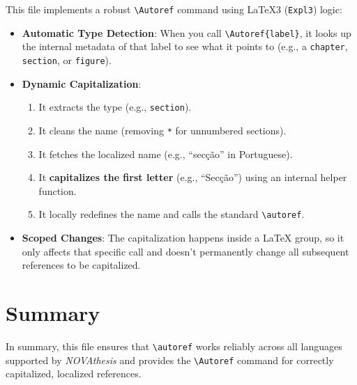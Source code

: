This file implements a robust \texttt{\textbackslash Autoref} command using \LaTeX3 (\texttt{Expl3}) logic:
\begin{itemize}
    \item \textbf{Automatic Type Detection}: When you call \texttt{\textbackslash Autoref\{label\}}, it looks up the internal metadata of that label to see what it points to (e.g., a \texttt{chapter}, \texttt{section}, or \texttt{figure}).
    \item \textbf{Dynamic Capitalization}: 
    \begin{enumerate}
        \item It extracts the type (e.g., \texttt{section}).
        \item It cleans the name (removing \texttt{*} for unnumbered sections).
        \item It fetches the localized name (e.g., ``secção'' in Portuguese).
        \item It \textbf{capitalizes the first letter} (e.g., ``Secção'') using an internal helper function.
        \item It locally redefines the name and calls the standard \texttt{\textbackslash autoref}.
    \end{enumerate}
    \item \textbf{Scoped Changes}: The capitalization happens inside a \LaTeX{} group, so it only affects that specific call and doesn't permanently change all subsequent references to be capitalized.
\end{itemize}

\section{Summary}
In summary, this file ensures that \texttt{\textbackslash autoref} works reliably across all languages supported by \emph{NOVAthesis} and provides the \texttt{\textbackslash Autoref} command for correctly capitalized, localized references.
